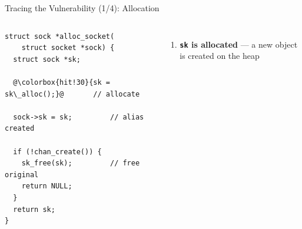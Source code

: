 \documentclass[aspectratio=169,10pt]{beamer}
\begin{document}


\begin{frame}[fragile]{Tracing the Vulnerability (1/4): Allocation}
  \begin{columns}
    \begin{tcolorbox}[colback=c1!3, colframe=c1!40!black, boxrule=0.5pt,
      left=4pt, right=4pt, top=4pt, bottom=4pt, arc=3pt,
      shadow={0.5mm}{-0.5mm}{0mm}{black!15}]
    \begin{lstlisting}[style=ccode, basicstyle=\ttfamily\scriptsize\color{black!80},
      keywordstyle=\color{c4}\bfseries, commentstyle=\color{c1!70!black}\itshape,
      stringstyle=\color{c6}, escapechar=@]
struct sock *alloc_socket(
    struct socket *sock) {
  struct sock *sk;

  @\colorbox{hit!30}{sk = sk\_alloc();}@       // allocate

  sock->sk = sk;         // alias created

  if (!chan_create()) {
    sk_free(sk);         // free original
    return NULL;
  }
  return sk;
}
    \end{lstlisting}
    \end{tcolorbox}

    \begin{enumerate}
      \item[\faCheckCircle] \textbf{\texttt{sk} is allocated} — a new object is created on the heap
    \end{enumerate}
  \end{columns}
\end{frame}
\end{document}

